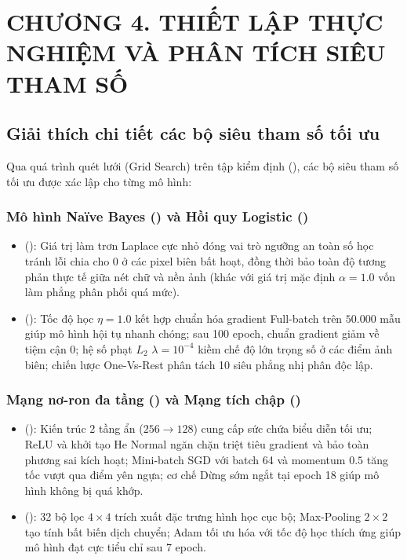 \section*{CHƯƠNG 4. THIẾT LẬP THỰC NGHIỆM VÀ PHÂN TÍCH SIÊU THAM SỐ}
\setcounter{section}{4}
\setcounter{subsection}{0}

\subsection{Giải thích chi tiết các bộ siêu tham số tối ưu}
Qua quá trình quét lưới (Grid Search) trên tập kiểm định (), các bộ siêu tham số tối ưu được xác lập cho từng mô hình:

\subsubsection{Mô hình Naïve Bayes () và Hồi quy Logistic ()}
\begin{itemize}
    \item {} (): Giá trị làm trơn Laplace cực nhỏ đóng vai trò ngưỡng an toàn số học tránh lỗi chia cho $0$ ở các pixel biên bất hoạt, đồng thời bảo toàn độ tương phản thực tế giữa nét chữ và nền ảnh (khác với giá trị mặc định $\alpha = 1.0$ vốn làm phẳng phân phối quá mức).
    \item {} (): Tốc độ học $\eta = 1.0$ kết hợp chuẩn hóa gradient Full-batch trên $50.000$ mẫu giúp mô hình hội tụ nhanh chóng; sau 100 epoch, chuẩn gradient giảm về tiệm cận $0$; hệ số phạt $L_2$ $\lambda = 10^{-4}$ kiềm chế độ lớn trọng số ở các điểm ảnh biên; chiến lược One-Vs-Rest phân tách 10 siêu phẳng nhị phân độc lập.
\end{itemize}

\subsubsection{Mạng nơ-ron đa tầng () và Mạng tích chập ()}
\begin{itemize}
    \item {} (): Kiến trúc 2 tầng ẩn ($256 \rightarrow 128$) cung cấp sức chứa biểu diễn tối ưu; ReLU và khởi tạo He Normal ngăn chặn triệt tiêu gradient và bảo toàn phương sai kích hoạt; Mini-batch SGD với batch 64 và momentum $0.5$ tăng tốc vượt qua điểm yên ngựa; cơ chế Dừng sớm ngắt tại epoch 18 giúp mô hình không bị quá khớp.
    \item {} (): 32 bộ lọc $4 \times 4$ trích xuất đặc trưng hình học cục bộ; Max-Pooling $2 \times 2$ tạo tính bất biến dịch chuyển; Adam tối ưu hóa với tốc độ học thích ứng giúp mô hình đạt cực tiểu chỉ sau 7 epoch.
\end{itemize}

